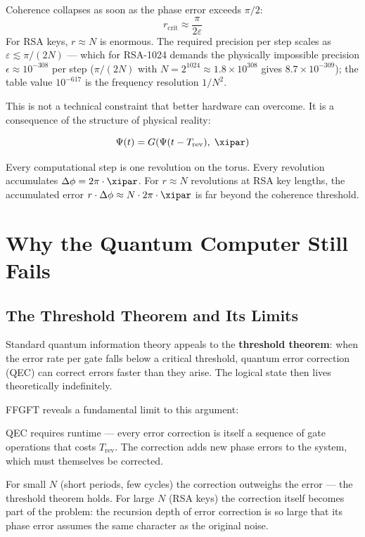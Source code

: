 Coherence collapses as soon as the phase error exceeds $\pi/2$:
\begin{equation}
    r_\text{crit} \approx \frac{\pi}{2\varepsilon}
\end{equation}
For RSA keys, $r \approx N$ is enormous. The required precision per step scales as
$\varepsilon \lesssim \pi/(2N)$ — which for RSA-1024 demands the physically
impossible precision $\epsilon \approx 10^{-308}$ per step
($\pi/(2N)$ with $N = 2^{1024} \approx 1.8\times 10^{308}$ gives $8.7\times 10^{-309}$);
the table value $10^{-617}$ is the frequency resolution $1/N^2$.

\begin{foundation}
This is not a technical constraint that better hardware can overcome.
It is a consequence of the structure of physical reality:

\begin{equation}
    \Psi(t) = G\!\left(\Psi(t - T_\text{rev}),\; \xipar\right)
\end{equation}

Every computational step is one revolution on the torus. Every revolution
accumulates $\Delta\phi = 2\pi \cdot \xipar$. For $r \approx N$ revolutions
at RSA key lengths, the accumulated error $r \cdot \Delta\phi \approx N \cdot
2\pi \cdot \xipar$ is far beyond the coherence threshold.
\end{foundation}


\section{Why the Quantum Computer Still Fails}

\subsection{The Threshold Theorem and Its Limits}

Standard quantum information theory appeals to the \textbf{threshold theorem}:
when the error rate per gate falls below a critical threshold, quantum error
correction (QEC) can correct errors faster than they arise. The logical state
then lives theoretically indefinitely.

FFGFT reveals a fundamental limit to this argument:

\begin{important}
QEC requires runtime — every error correction is itself a sequence of gate
operations that costs $T_\text{rev}$. The correction adds new phase errors
to the system, which must themselves be corrected.

For small $N$ (short periods, few cycles) the correction outweighs the error
— the threshold theorem holds. For large $N$ (RSA keys) the correction itself
becomes part of the problem: the recursion depth of error correction is so
large that its phase error assumes the same character as the original noise.
\end{important}

